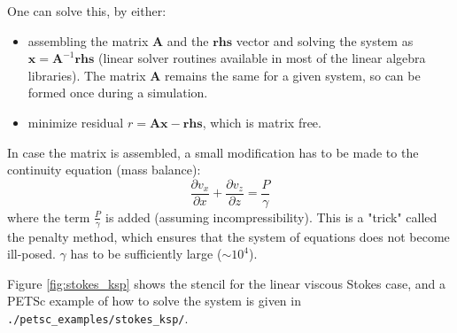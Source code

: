 \documentclass[a4paper,11pt]{article}
\begin{document}
One can solve this, by either:
\begin{itemize} 
\item assembling the matrix $\textbf{A}$ and the $\textbf{rhs}$ vector and solving the system as $\textbf{x} = \textbf{A}^{-1}\textbf{rhs}$ (linear solver routines available in most of the linear algebra libraries). The matrix $\textbf{A}$ remains the same for a given system, so can be formed once during a simulation. 
\item minimize residual $r = \textbf{A} \textbf{x} - \textbf{rhs}$, which is matrix free.
\end{itemize}

In case the matrix is assembled, a small modification has to be made to the continuity equation (mass balance):
\begin{equation}
\frac{\displaystyle \partial v_x}{\displaystyle \partial x}+\frac{\displaystyle \partial v_z}{\displaystyle \partial z} = \frac{\displaystyle P}{\displaystyle \gamma}
\end{equation}
where the term $\frac{P}{\gamma}$ is added (assuming incompressibility). This is a "trick" called the penalty method, which ensures that the system of equations does not become ill-posed. $\gamma$ has to be sufficiently large ($\sim 10^4$).

Figure \ref{fig:stokes_ksp} shows the stencil for the linear viscous Stokes case, and a PETSc example of how to solve the system is given in \texttt{./petsc\_examples/stokes\_ksp/}.
\end{document}
